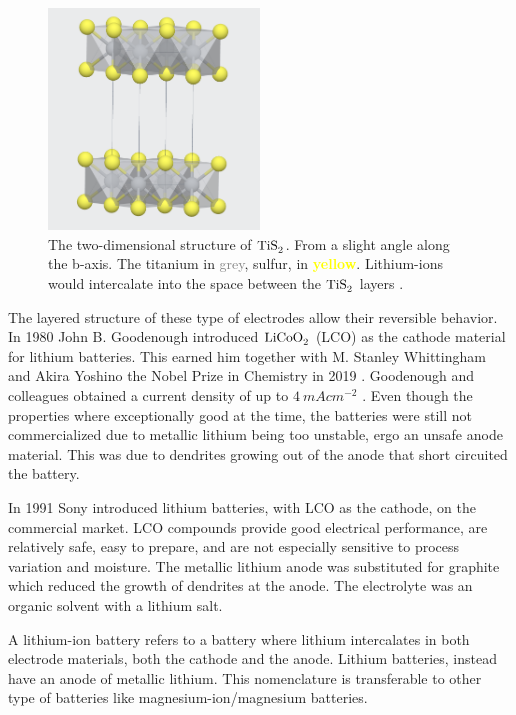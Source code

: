\begin{figure}[H]
    \centering
    \includegraphics[width=0.5\textwidth]{TiS2.png}
    \caption{The two-dimensional structure of $\ce{TiS_2}$. From a slight angle along the b-axis. The titanium in \textcolor{gray}{grey}, sulfur, in \textcolor{yellow}{\textbf{yellow}}. Lithium-ions would intercalate into the space between the $\ce{TiS_2}$ layers \cite{materialsproject:TiS2}.}
    \label{fig:MPTiS2}
\end{figure}

The layered structure of these type of electrodes allow their reversible behavior. In 1980 John B. Goodenough introduced $\ce{LiCoO_2}$ (\ac{LCO}) as the cathode material for lithium batteries. This earned him together with M. Stanley Whittingham and Akira Yoshino the Nobel Prize in Chemistry in 2019 \cite{nobprize}. Goodenough and colleagues obtained a current density of up to $\SI{4}{mAcm^{-2}}$ \cite{mizushima1980lixcoo2} \cite{goodenough1980solid}. Even though the properties where exceptionally good at the time, the batteries were still not commercialized due to metallic lithium being too unstable, ergo an unsafe anode material. This was due to dendrites growing out of the anode that short circuited the battery.

In 1991 Sony introduced lithium batteries, with LCO as the cathode, on the commercial market. LCO compounds provide good electrical performance, are relatively safe, easy to prepare, and are not especially sensitive to process variation and moisture. The metallic lithium anode was substituted for graphite which reduced the growth of dendrites at the anode. The electrolyte was an organic solvent with a lithium salt.

A lithium-ion battery refers to a battery where lithium intercalates in both electrode materials, both the cathode and the anode. Lithium batteries, instead have an anode of metallic lithium. This nomenclature is transferable to other type of batteries like magnesium-ion/magnesium batteries.

